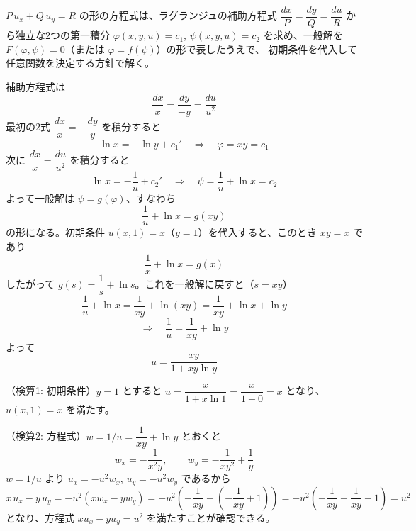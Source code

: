 
$P\,u_{x} + Q\,u_{y} = R$ の形の方程式は、ラグランジュの補助方程式
$\dfrac{dx}{P} = \dfrac{dy}{Q} = \dfrac{du}{R}$ から独立な2つの第一積分
$\varphi(x,y,u) = c_{1}$, $\psi(x,y,u) = c_{2}$ を求め、一般解を
$F(\varphi, \psi) = 0$（または $\varphi = f(\psi)$）の形で表したうえで、
初期条件を代入して任意関数を決定する方針で解く。

補助方程式は
\[
\frac{dx}{x} = \frac{dy}{-y} = \frac{du}{u^{2}}
\]
最初の2式 $\dfrac{dx}{x} = -\dfrac{dy}{y}$ を積分すると
\[
\ln x = -\ln y + c_{1}' \quad\Longrightarrow\quad \varphi = xy = c_{1}
\]
次に $\dfrac{dx}{x} = \dfrac{du}{u^{2}}$ を積分すると
\[
\ln x = -\frac{1}{u} + c_{2}' \quad\Longrightarrow\quad \psi = \frac{1}{u} + \ln x = c_{2}
\]
よって一般解は $\psi = g(\varphi)$、すなわち
\[
\frac{1}{u} + \ln x = g(xy)
\]
の形になる。初期条件 $u(x,1) = x$（$y=1$）を代入すると、このとき $xy = x$ であり
\[
\frac{1}{x} + \ln x = g(x)
\]
したがって $g(s) = \dfrac{1}{s} + \ln s$。これを一般解に戻すと（$s = xy$）
\[
\frac{1}{u} + \ln x = \frac{1}{xy} + \ln(xy) = \frac{1}{xy} + \ln x + \ln y
\]
\[
\Longrightarrow \quad \frac{1}{u} = \frac{1}{xy} + \ln y
\]
よって
\[
\boxed{\; u = \frac{xy}{1 + xy\ln y} \;}
\]

（検算1: 初期条件）$y=1$ とすると $u = \dfrac{x}{1 + x\ln 1} = \dfrac{x}{1+0} = x$ となり、$u(x,1)=x$ を満たす。

（検算2: 方程式）$w = 1/u = \dfrac{1}{xy} + \ln y$ とおくと
\[
w_{x} = -\frac{1}{x^{2}y}, \qquad w_{y} = -\frac{1}{xy^{2}} + \frac{1}{y}
\]
$w = 1/u$ より $u_{x} = -u^{2} w_{x}$, $u_{y} = -u^{2} w_{y}$ であるから
\[
x\,u_{x} - y\,u_{y}
= -u^{2}\left(x w_{x} - y w_{y}\right)
= -u^{2}\left(-\frac{1}{xy} - \left(-\frac{1}{xy} + 1\right)\right)
= -u^{2}\left(-\frac{1}{xy} + \frac{1}{xy} - 1\right)
= u^{2}
\]
となり、方程式 $x u_{x} - y u_{y} = u^{2}$ を満たすことが確認できる。
